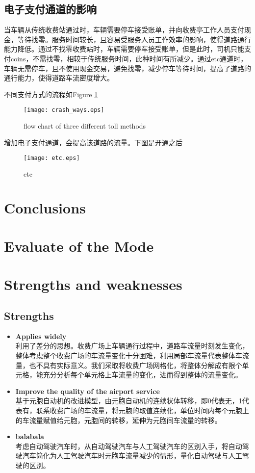 \documentclass{mcmthesis}
\begin{document}
\subsection{电子支付通道的影响}

当车辆从传统收费站通过时，车辆需要停车接受账单，并向收费亭工作人员支付现金，等待找零。服务时间较长，且容易受服务人员工作效率的影响，使得道路通行能力降低。通过不找零收费站时，车辆需要停车接受账单，但是此时，司机只能支付coins，不需找零，相较于传统服务时间，此种时间有所减少。通过etc通道时，车辆无需停车，且不使用现金交易，避免找零，减少停车等待时间，提高了道路的通行能力，使得道路车流密度增大\cite{spiliopoulou2009toll}。

不同支付方式的流程如Figure \ref{fig:crash_ways}

\begin{figure}
	\centering
	\texttt{[image: crash\_ways.eps]}
	\caption{flow chart of three different toll methods}
	\label{fig:crash_ways}
\end{figure}

增加电子支付通道，会提高该道路的流量。下图是开通之后
\begin{figure}[!htbp]
	\small
	\centering
	\texttt{[image: etc.eps]}
	\caption{etc} 
	\label{fig:etc}
\end{figure}
\section{Conclusions}
\lipsum[6]

\section{Evaluate of the Mode}

\section{Strengths and weaknesses}
\subsection{Strengths}
\begin{itemize}
\item \textbf{Applies widely}\\
利用了差分的思想。收费广场上车辆通行过程中，道路车流量时刻发生变化，整体考虑整个收费广场的车流量变化十分困难，利用局部车流量代表整体车流量，也不具有实际意义。我们采取将收费广场网格化，将整体分解成有限个单元格，能充分分析每个单元格上车流量的变化，进而得到整体的流量变化。
\item \textbf{Improve the quality of the airport service}\\
基于元胞自动机的改进模型，由元胞自动机的连续状体转移，即0代表无，1代表有，联系收费广场的车流量，将元胞的取值连续化，单位时间内每个元胞上的车流量赋值给元胞，元胞间的转移，延伸为元胞间车流量的转移。
\item \textbf{balabala}\\
考虑自动驾驶汽车时，从自动驾驶汽车与人工驾驶汽车的区别入手，将自动驾驶汽车简化为人工驾驶汽车时元胞车流量减少的情形，量化自动驾驶与人工驾驶的区别。
\end{itemize}
\end{document}
